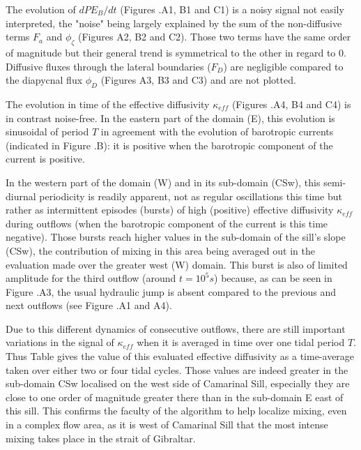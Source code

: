 The evolution of $dPE_B/dt$ (Figures .A1, B1 and C1) is a noisy signal not easily interpreted, the "noise" being largely explained by the sum of the non-diffusive terms $F_a$ and $\phi_{\zeta}$ (Figures A2, B2 and C2). Those two terms have the same order of magnitude but their general trend is symmetrical to the other in regard to 0. Diffusive fluxes through the lateral boundaries ($F_D$) are negligible compared to the diapycnal flux $\phi_D$ (Figures A3, B3 and C3) and are not plotted.

The evolution in time of the effective diffusivity $\kappa_{eff}$ (Figures .A4, B4 and C4) is in contrast noise-free. In the eastern part of the domain (E), this evolution is sinusoidal of period $T$ in agreement with the evolution of barotropic currents (indicated in Figure .B): it is positive when the barotropic component of the current is positive.

In the western part of the domain (W) and in its sub-domain (CSw), this semi-diurnal periodicity is readily apparent, not as regular oscillations this time but rather as intermittent episodes (bursts) of high (positive) effective diffusivity $\kappa_{eff}$ during outflows (when the barotropic component of the current is this time negative). Those bursts reach higher values in the sub-domain of the sill's slope (CSw), the contribution of mixing in this area being averaged out in the evaluation made over the greater west (W) domain. This burst is also of limited amplitude for the third outflow (around $t=10^5s$) because, as can be seen in Figure .A3, the usual hydraulic jump is absent compared to the previous and next outflows (see Figure .A1 and A4).

Due to this different dynamics of consecutive outflows, there are still important variations in the signal of $\kappa_{eff}$ when it is averaged in time over one tidal period $T$. Thus Table  gives the value of this evaluated effective diffusivity as a time-average taken over either two or four tidal cycles. Those values are indeed greater in the sub-domain CSw localised on the west side of Camarinal Sill, especially they are close to one order of magnitude greater there than in the sub-domain E east of this sill. This confirms the faculty of the algorithm to help localize mixing, even in a complex flow area, as it is west of Camarinal Sill that the most intense mixing takes place in the strait of Gibraltar.

